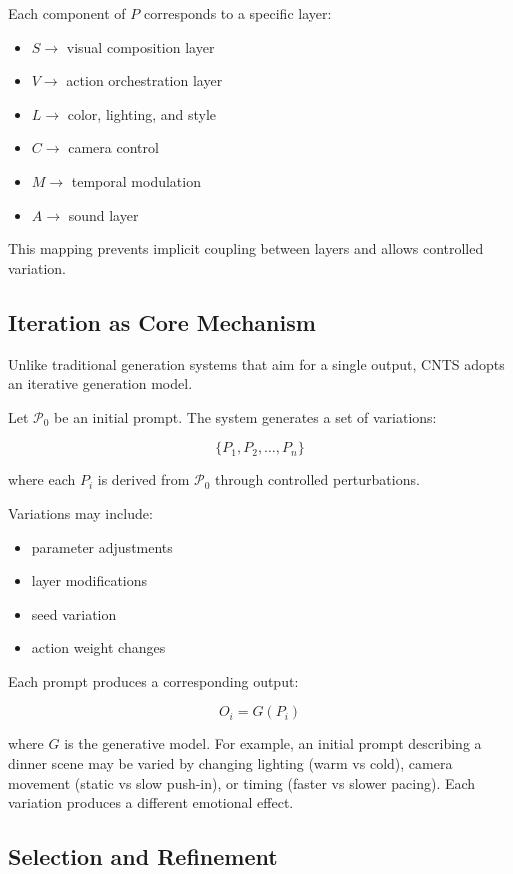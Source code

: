\documentclass[preprints,article,submit,pdftex,moreauthors,accept]{Definitions/mdpi}
\begin{document}
Each component of $P$ corresponds to a specific layer:

\begin{itemize}
    \item $S \rightarrow$ visual composition layer
    \item $V \rightarrow$ action orchestration layer
    \item $L \rightarrow$ color, lighting, and style
    \item $C \rightarrow$ camera control
    \item $M \rightarrow$ temporal modulation
    \item $A \rightarrow$ sound layer
\end{itemize}

This mapping prevents implicit coupling between layers and allows controlled variation.

\subsection{Iteration as Core Mechanism}

Unlike traditional generation systems that aim for a single output, CNTS adopts an iterative generation model.

Let $\mathcal{P}_0$ be an initial prompt. The system generates a set of variations:

\[
\{ P_1, P_2, \dots, P_n \}
\]

where each $P_i$ is derived from $\mathcal{P}_0$ through controlled perturbations.

Variations may include:
\begin{itemize}
    \item parameter adjustments
    \item layer modifications
    \item seed variation
    \item action weight changes
\end{itemize}

Each prompt produces a corresponding output:

\[
O_i = G(P_i)
\]

where $G$ is the generative model.
For example, an initial prompt describing a dinner scene may be varied by changing lighting (warm vs cold), camera movement (static vs slow push-in), or timing (faster vs slower pacing). Each variation produces a different emotional effect.
\subsection{Selection and Refinement}
\end{document}
